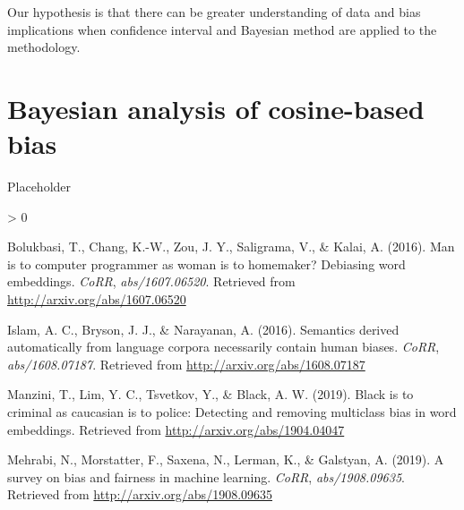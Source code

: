 \documentclass[
]{book}
\newlength{\cslhangindent}
\newenvironment{CSLReferences}[2] %
 {%
  \setlength{\parindent}{0pt}
  \ifodd #1 \everypar{\setlength{\hangindent}{\cslhangindent}}\ignorespaces\fi
  \ifnum #2 > 0
  \setlength{\parskip}{#2\baselineskip}
  \fi
 }%
 {}
\begin{document}
Our hypothesis is that there can be greater understanding of data and bias implications when confidence interval and Bayesian method are applied to the
methodology.

\hypertarget{bayesian-analysis-of-cosine-based-bias}{%
\chapter{Bayesian analysis of cosine-based bias}\label{bayesian-analysis-of-cosine-based-bias}}

Placeholder

\hypertarget{refs}{}
\begin{CSLReferences}{1}{0}
\leavevmode\hypertarget{ref-Bolukbasi2016Man}{}%
Bolukbasi, T., Chang, K.-W., Zou, J. Y., Saligrama, V., \& Kalai, A. (2016). Man is to computer programmer as woman is to homemaker? Debiasing word embeddings. \emph{CoRR}, \emph{abs/1607.06520}. Retrieved from \url{http://arxiv.org/abs/1607.06520}

\leavevmode\hypertarget{ref-Caliskan2017Semantics}{}%
Islam, A. C., Bryson, J. J., \& Narayanan, A. (2016). Semantics derived automatically from language corpora necessarily contain human biases. \emph{CoRR}, \emph{abs/1608.07187}. Retrieved from \url{http://arxiv.org/abs/1608.07187}

\leavevmode\hypertarget{ref-manzini2019black}{}%
Manzini, T., Lim, Y. C., Tsvetkov, Y., \& Black, A. W. (2019). Black is to criminal as caucasian is to police: Detecting and removing multiclass bias in word embeddings. Retrieved from \url{http://arxiv.org/abs/1904.04047}

\leavevmode\hypertarget{ref-Mehrabi2019Survey}{}%
Mehrabi, N., Morstatter, F., Saxena, N., Lerman, K., \& Galstyan, A. (2019). A survey on bias and fairness in machine learning. \emph{CoRR}, \emph{abs/1908.09635}. Retrieved from \url{http://arxiv.org/abs/1908.09635}

\end{CSLReferences}
\end{document}
